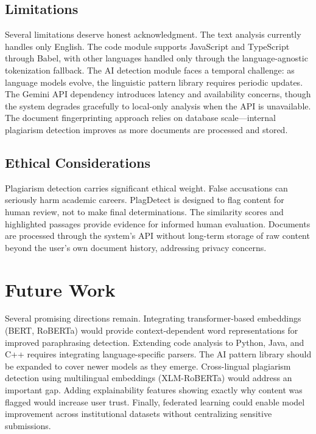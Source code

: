 \documentclass[10pt,twocolumn]{article}
\begin{document}
\subsection{Limitations}

Several limitations deserve honest acknowledgment. The text analysis currently handles only English. The code module supports JavaScript and TypeScript through Babel, with other languages handled only through the language-agnostic tokenization fallback. The AI detection module faces a temporal challenge: as language models evolve, the linguistic pattern library requires periodic updates. The Gemini API dependency introduces latency and availability concerns, though the system degrades gracefully to local-only analysis when the API is unavailable. The document fingerprinting approach relies on database scale---internal plagiarism detection improves as more documents are processed and stored.

\subsection{Ethical Considerations}

Plagiarism detection carries significant ethical weight. False accusations can seriously harm academic careers. PlagDetect is designed to flag content for human review, not to make final determinations. The similarity scores and highlighted passages provide evidence for informed human evaluation. Documents are processed through the system's API without long-term storage of raw content beyond the user's own document history, addressing privacy concerns.

\section{Future Work}

Several promising directions remain. Integrating transformer-based embeddings (BERT, RoBERTa) would provide context-dependent word representations for improved paraphrasing detection. Extending code analysis to Python, Java, and C++ requires integrating language-specific parsers. The AI pattern library should be expanded to cover newer models as they emerge. Cross-lingual plagiarism detection using multilingual embeddings (XLM-RoBERTa) would address an important gap. Adding explainability features showing exactly why content was flagged would increase user trust. Finally, federated learning could enable model improvement across institutional datasets without centralizing sensitive submissions.
\end{document}
